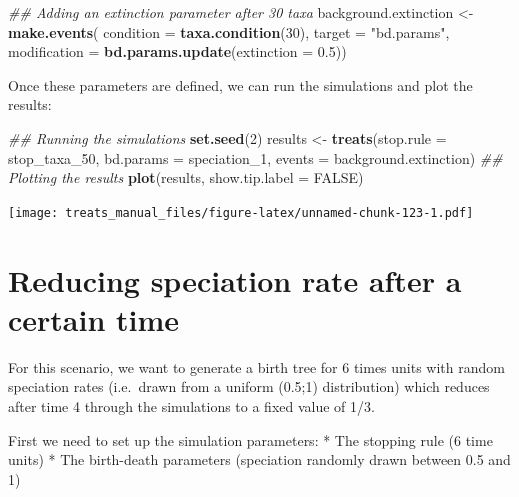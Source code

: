 \documentclass[
]{book}
\newenvironment{Shaded}{\begin{snugshade}}{\end{snugshade}}
\newcommand{\CommentTok}[1]{\textcolor[rgb]{0.56,0.35,0.01}{\textit{#1}}}
\newcommand{\DataTypeTok}[1]{\textcolor[rgb]{0.13,0.29,0.53}{#1}}
\newcommand{\DecValTok}[1]{\textcolor[rgb]{0.00,0.00,0.81}{#1}}
\newcommand{\FloatTok}[1]{\textcolor[rgb]{0.00,0.00,0.81}{#1}}
\newcommand{\KeywordTok}[1]{\textcolor[rgb]{0.13,0.29,0.53}{\textbf{#1}}}
\newcommand{\NormalTok}[1]{#1}
\newcommand{\OtherTok}[1]{\textcolor[rgb]{0.56,0.35,0.01}{#1}}
\newcommand{\StringTok}[1]{\textcolor[rgb]{0.31,0.60,0.02}{#1}}
\begin{document}
\begin{Shaded}
\begin{Highlighting}[]
\CommentTok{\#\# Adding an extinction parameter after 30 taxa}
\NormalTok{background.extinction \textless{}{-}}\StringTok{ }\KeywordTok{make.events}\NormalTok{(}
                      \DataTypeTok{condition =} \KeywordTok{taxa.condition}\NormalTok{(}\DecValTok{30}\NormalTok{),}
                      \DataTypeTok{target =} \StringTok{"bd.params"}\NormalTok{,}
                      \DataTypeTok{modification =} \KeywordTok{bd.params.update}\NormalTok{(}\DataTypeTok{extinction =} \FloatTok{0.5}\NormalTok{))}
\end{Highlighting}
\end{Shaded}

Once these parameters are defined, we can run the simulations and plot the results:

\begin{Shaded}
\begin{Highlighting}[]
\CommentTok{\#\# Running the simulations}
\KeywordTok{set.seed}\NormalTok{(}\DecValTok{2}\NormalTok{)}
\NormalTok{results \textless{}{-}}\StringTok{ }\KeywordTok{treats}\NormalTok{(}\DataTypeTok{stop.rule =}\NormalTok{ stop\_taxa\_}\DecValTok{50}\NormalTok{,}
                \DataTypeTok{bd.params =}\NormalTok{ speciation\_}\DecValTok{1}\NormalTok{,}
                \DataTypeTok{events =}\NormalTok{ background.extinction)}
\CommentTok{\#\# Plotting the results}
\KeywordTok{plot}\NormalTok{(results, }\DataTypeTok{show.tip.label =} \OtherTok{FALSE}\NormalTok{)}
\end{Highlighting}
\end{Shaded}

\texttt{[image: treats\_manual\_files/figure-latex/unnamed-chunk-123-1.pdf]}

\hypertarget{EGred_spec}{%
\section{Reducing speciation rate after a certain time}\label{EGred_spec}}

For this scenario, we want to generate a birth tree for 6 times units with random speciation rates (i.e.~drawn from a uniform (0.5;1) distribution) which reduces after time 4 through the simulations to a fixed value of 1/3.

First we need to set up the simulation parameters:
* The stopping rule (6 time units)
* The birth-death parameters (speciation randomly drawn between 0.5 and 1)
\end{document}
